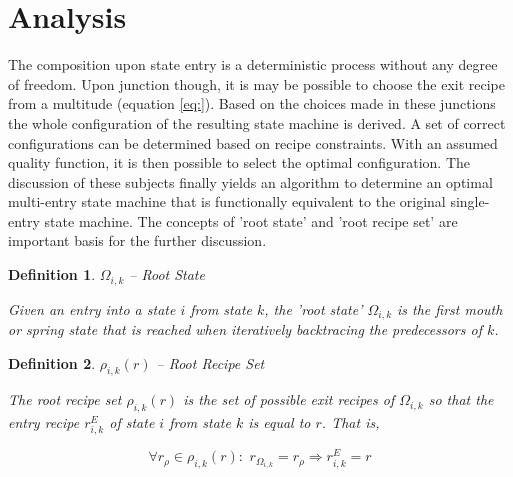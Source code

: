 \documentclass[12pt,a4paper]{scrartcl}
\newtheorem{definition}{Definition}
\begin{document}
\section{Analysis}

The composition upon state entry is a deterministic process without any degree
of freedom. Upon junction though, it is may be possible to choose the exit
recipe from a multitude (equation \ref{eq:}). Based on the choices made in
these junctions the whole configuration of the resulting state machine is
derived. A set of correct configurations can be determined based on recipe
constraints.  With an assumed quality function, it is then possible to select
the optimal configuration. The discussion of these subjects finally yields an
algorithm to determine an optimal  multi-entry state machine that is
functionally equivalent to the original single-entry state machine.  The
concepts of 'root state' and 'root recipe set' are important basis for the
further discussion.

\begin{definition} $\Omega_{i,k}$ -- Root State

    Given an entry into a state $i$ from state $k$, the 'root state'
    $\Omega_{i,k}$ is the first mouth or spring state that is reached when
    iteratively backtracing the predecessors of $k$.
    
\end{definition}

\begin{definition} $\rho_{i,k}(r)$ -- Root Recipe Set

    The root recipe set $\rho_{i,k}(r)$ is the set of possible exit recipes of
    $\Omega_{i,k}$ so that the entry recipe $r^E_{i,k}$ of state $i$ from state
    $k$ is equal to $r$. That is,

    \begin{equation}
        \forall r_\rho \in \rho_{i,k}(r):\,\,r_{\Omega_{i,k}} = r_\rho \Rightarrow r^E_{i,k} = r
    \end{equation}
    
\end{definition}
\end{document}
